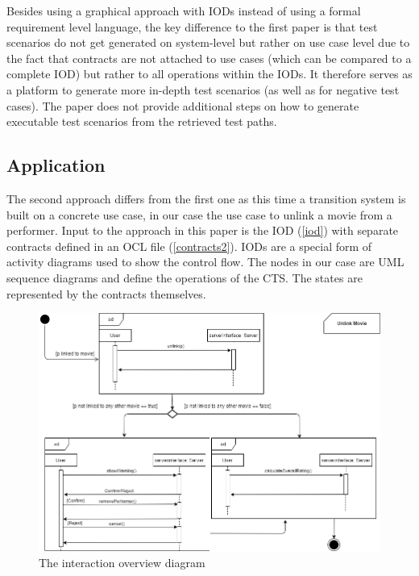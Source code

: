 Besides using a graphical approach with IODs instead of using a formal requirement level language, the key difference to the first paper is that test scenarios do not get generated on system-level but rather on use case level due to the fact that contracts are not attached to use cases (which can be compared to a complete IOD) but rather to all operations within the IODs. It therefore serves as a platform to generate more in-depth test scenarios (as well as for negative test cases). The paper does not provide additional steps on how to generate executable test scenarios from the retrieved test paths. 

\newpage

\subsection{Application}

The second approach differs from the first one as this time a transition system is built on a concrete use case, in our case the use case to unlink a movie from a performer. Input to the approach in this paper is the IOD (\autoref{iod}) with separate contracts defined in an OCL file (\autoref{contracts2}). IODs are a special form of activity diagrams used to show the control flow. The nodes in our case are UML sequence diagrams and define the operations of the CTS. The states are represented by the contracts themselves. 

\begin{figure}[h]
	\centering
	\includegraphics[width=\textwidth]{../images/topic3_iod.png}
	\caption{The interaction overview diagram}
	\label{iod}
\end{figure}

